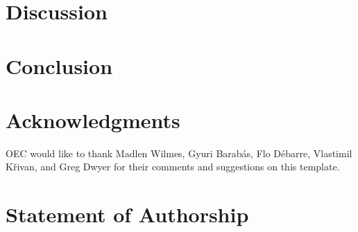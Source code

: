 \documentclass[11pt]{article}
\begin{document}
\section*{Discussion}

%

\section*{Conclusion}



\section*{Acknowledgments}

OEC would like to thank Madlen Wilmes, Gyuri Barab\'{a}s, Flo D\'{e}barre, Vlastimil K\v{r}ivan, and Greg Dwyer for their comments and suggestions on this template.


\section*{Statement of Authorship}
\end{document}
